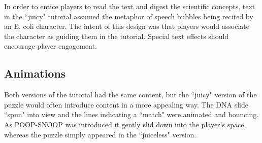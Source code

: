 In order to entice players to read the text and digest the scientific concepts, text in the ``juicy" tutorial assumed the metaphor of speech bubbles being recited by an E. coli character. The intent of this design was that players would associate the character as guiding them in the tutorial. Special text effects should encourage player engagement. 

\subsection{Animations}

Both versions of the tutorial had the same content, but the ``juicy" version of the puzzle would often introduce content in a more appealing way. The DNA slide ``spun" into view and the lines indicating a ``match" were animated and bouncing. As POOP-SNOOP was introduced it gently slid down into the player's space, whereas the puzzle simply appeared in the ``juiceless" version.
